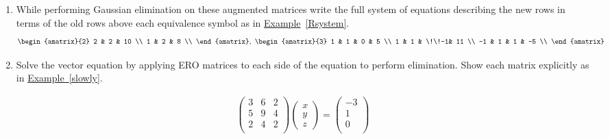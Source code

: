 


\begin{enumerate}

\item While performing  Gaussian elimination on these augmented matrices write the full system of equations describing the new rows in terms of the old rows above each equivalence symbol as in  \hyperlink{Keeping track of EROs with equations between rows}{Example}~\ref{Rsystem}. 
$$
\begin{amatrix}{2} 
2 & 2 & 10 \\
1 & 2 & 8 \\
\end{amatrix}
,~
\begin{amatrix}{3} 
1 & 1 & 0 & 5 \\
1 & 1 & \!\!-1& 11 \\
-1 & 1 & 1 & -5 \\ 
\end{amatrix}
$$


\item Solve the vector equation by applying ERO matrices to each side of the equation to perform elimination. Show each matrix explicitly as in \hyperlink{Undoing}{Example~\ref{slowly}}.

\begin{eqnarray*}
\begin{pmatrix}
3	&6 	&2 \\ %
5 	&9 	&4 \\ %
2	&4	&2 \\ %
\end{pmatrix} 
\begin{pmatrix}
 x \\ 
y \\
z 
\end{pmatrix} 
=
\begin{pmatrix}
-3 \\ 
1  \\
0  \\
\end{pmatrix} 
\end{eqnarray*}



\end{enumerate}
